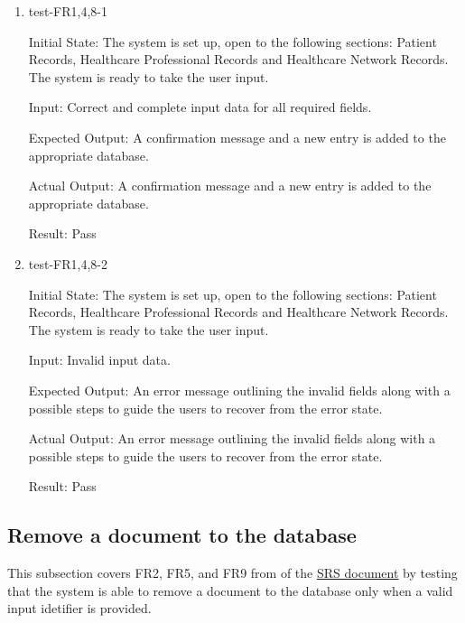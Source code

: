 \documentclass[12pt, titlepage]{article}
\begin{document}
\begin{enumerate}

  \item{test-FR1,4,8-1} \label{test-FR1,4,8-1}
  
  Initial State: The system is set up, open to the following sections: Patient Records, Healthcare Professional Records and Healthcare Network Records. The system is ready to take the user input.

  Input: Correct and complete input data for all required fields.

  Expected Output: A confirmation message and a new entry is added to the appropriate database.

  Actual Output: A confirmation message and a new entry is added to the appropriate database.

  Result: Pass


  \item{test-FR1,4,8-2} \label{test-FR1,4,8-2}

  Initial State: The system is set up, open to the following sections: Patient Records, Healthcare Professional Records and Healthcare Network Records. The system is ready to take the user input.

  Input: Invalid input data.

  Expected Output: An error message outlining the invalid fields along with a possible steps to guide the users to recover from the error state.

  Actual Output: An error message outlining the invalid fields along with a possible steps to guide the users to recover from the error state.

  Result: Pass

\end{enumerate}

\subsection{Remove a document to the database} \label{section:3.2}

This subsection covers FR2, FR5, and FR9 from of the \href{https://github.com/Inreet-Kaur/capstone/blob/main/docs/SRS/SRS.pdf}{SRS document} by testing that the system is able to remove a document to the database only when a valid input idetifier is provided.
\end{document}
